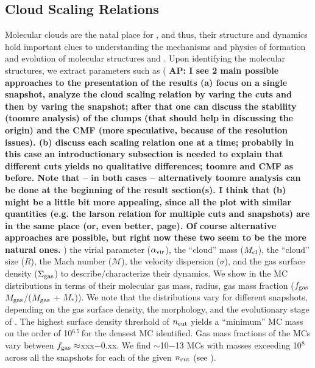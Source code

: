 \documentclass[apj]{emulateapj} %
\newcommand{\AP}[1]{({\bf \color{apcolor} AP: #1})}
\begin{document}
{\subsection{Cloud Scaling Relations}
Molecular clouds are the natal place for \SF, and thus,
their structure and dynamics hold important clues to understanding
the mechanisms and physics of formation and evolution of molecular structures and \SF.
Upon identifying the molecular structures, we extract parameters such as
\AP{I see 2 main possible approaches to the presentation of the results
%
(a) focus on a single snapshot, analyze the cloud scaling relation by varing the cuts and then by varing the snapshot; after that one can discuss the stability (toomre analysis) of the clumps (that should help in discussing the origin) and the CMF (more speculative, because of the resolution issues).
%
(b) discuss each scaling relation one at a time; probabily in this case an introductionary subsection is needed to explain that different cuts yields no qualitative differences; toomre and CMF as before.
%
Note that -- in both cases -- alternatively toomre analysis can be done at the beginning of the result section(s).
%
I think that (b) might be a little bit more appealing, since all the plot with similar quantities (e.g. the larson relation for multiple cuts and snapshots) are in the same place (or, even better, page).
%
Of course alternative approaches are possible, but right now these two seem to be the more natural ones.
}
the virial parameter ($\alpha_{\rm vir}$),
the ``cloud'' mass ($M_{\rm cl}$),
the ``cloud'' size ($R$),
the Mach number ($\mathcal{M}$),
the velocity dispersion ($\sigma$), and the
gas surface density ($\Sigma_{\rm gas}$)
to describe/characterize their dynamics.
We show in \Fig{} the MC distributions in terms of their
molecular gas mass, radius, gas mass fraction ($f_{\rm gas}$\eq$M_{\rm gas}$/($M_{\rm gas}$ +
$M_*$)).
We note that the distributions vary for different snapshots, depending on
the gas surface density, the morphology, and the evolutionary stage of \flower.
The highest surface density threshold of $n_{\rm cut}$ yields a ``minimum'' MC mass on
the order of 10$^{6.5}$\,\Msun for the densest MC identified.
Gas mass fractions of the MCs vary between $f_{\rm gas}\approx$xxx$-$0.xx.
We find $\sim$10$-$13 MCs with masses exceeding 10$^8$\,\Msun across all the
snapshots for each of the given $n_{\rm cut}$ (see ).

}
\end{document}
